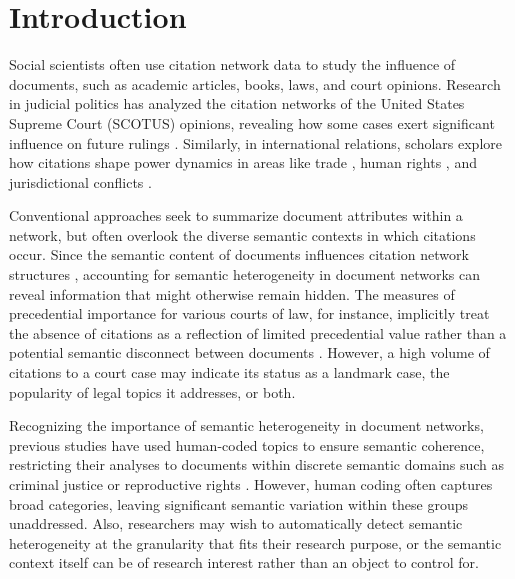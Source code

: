 \section{Introduction}

Social scientists often use citation network data to study the influence of documents, such as academic articles, books, laws, and court opinions. 
Research in judicial politics has analyzed the citation networks of the United States Supreme Court (SCOTUS) opinions, revealing how some cases exert significant influence on future rulings \citep{clark2012genealogy, fowler2007network}. 
Similarly, in international relations, scholars explore how citations shape power dynamics in areas like trade \citep{pelc2014politics}, human rights \citep{lupu2012precedent}, and jurisdictional conflicts \citep{larsson2017speaking}.

Conventional approaches seek to summarize document attributes within a network, but often overlook the diverse semantic contexts in which citations occur.
Since the semantic content of documents influences citation network structures \citep{bai2018neural, chang2010hrtm, zhang2022dynamic}, accounting for semantic heterogeneity in document networks can reveal information that might otherwise remain hidden.
The measures of precedential importance for various courts of law, for instance, implicitly treat the absence of citations as a reflection of limited precedential value rather than a potential semantic disconnect between documents \citep{fowler2007network, lupu2012precedent, pelc2014politics}. 
However, a high volume of citations to a court case may indicate its status as a landmark case, the popularity of legal topics it addresses, or both.

Recognizing the importance of semantic heterogeneity in document networks, previous studies have used human-coded topics to ensure semantic coherence, restricting their analyses to documents within discrete semantic domains such as criminal justice  \citep{olsen2017finding} or reproductive rights \citep{clark2012genealogy}.
However, human coding often captures broad categories, leaving significant semantic variation within these groups unaddressed. 
Also, researchers may wish to automatically detect semantic heterogeneity at the granularity that fits their research purpose, or the semantic context itself can be of research interest rather than an object to control for. 

